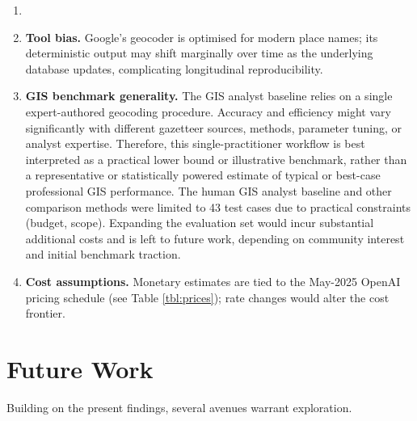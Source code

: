 \begin{enumerate}
  Because the language models ingested this noisy text directly, a
  fraction of the residual error may stem from imperfect input rather
  than conceptual failure.
\item
  \DIFaddbegin \textbf{} \item
  \DIFaddend \textbf{Tool bias.} Google's geocoder is optimised for modern place
  names; its deterministic output may shift marginally over time as the
  underlying database updates, complicating longitudinal
  reproducibility.
\item
  \textbf{GIS benchmark generality.} The GIS analyst baseline
  \citep{Bashorun2025_gis} relies on a single expert-authored geocoding
  procedure. Accuracy and efficiency might vary significantly with
  different gazetteer sources, methods, parameter tuning, or analyst
  expertise. Therefore, this single-practitioner workflow is best
  interpreted as a practical lower bound or illustrative benchmark,
  rather than a representative or statistically powered estimate of
  typical or best-case professional GIS performance. The human GIS
  analyst baseline and other comparison methods were limited to 43 test
  cases due to practical constraints (budget, scope). Expanding the
  evaluation set would incur substantial additional costs and is left to
  future work, depending on community interest and initial benchmark
  traction.
\item
  \textbf{Cost assumptions.} Monetary estimates are tied to the May-2025
  OpenAI pricing schedule (see Table \ref{tbl:prices}); rate changes
  would alter the cost frontier.
\end{enumerate}

\section{Future Work}\label{future-work}

Building on the present findings, several avenues warrant exploration.

